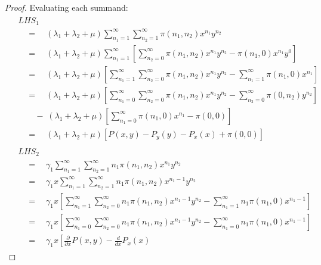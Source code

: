 \begin{proof}
    Evaluating each summand:
    \begin{align}
        \begin{split}
            & LHS_1 \\
            & \quad = \quad (\lambda_1 + \lambda_2 + \mu) \sum_{n_1=1}^{\infty} \sum_{n_2=1}^{\infty} \pi(n_1,n_2)x^{n_1}y^{n_2} \\
            & \quad = \quad (\lambda_1 + \lambda_2 + \mu) \sum_{n_1=1}^{\infty} \left[ \sum_{n_2=0}^{\infty} \pi(n_1,n_2) x^{n_1}y^{n_2} - \pi(n_1,0) x^{n_1} y^0 \right] \\
            & \quad = \quad (\lambda_1 + \lambda_2 + \mu) \left[
                \sum_{n_1=1}^{\infty} \sum_{n_2=0}^{\infty} \pi(n_1,n_2) x^{n_1}y^{n_2}
                - \sum_{n_1=1}^{\infty} \pi(n_1,0) x^{n_1}
            \right] \\
            & \quad = \quad (\lambda_1 + \lambda_2 + \mu) \left[
                \sum_{n_1=0}^{\infty} \sum_{n_2=0}^{\infty} \pi(n_1,n_2) x^{n_1}y^{n_2}
                - \sum_{n_2=0}^{\infty} \pi(0,n_2) y^{n_2}
            \right] \\
            & \quad \quad - \; (\lambda_1 + \lambda_2 + \mu) \left[
                \sum_{n_1=0}^{\infty} \pi(n_1,0) x^{n_1} - \pi(0,0)
            \right] \\
            & \quad = \quad (\lambda_1 + \lambda_2 + \mu) \left[ P(x,y) - P_y(y) - P_x(x) + \pi(0,0) \right]
        \end{split} \\
        \begin{split}
            & LHS_2 \\
            & \quad = \quad \gamma_1 \sum_{n_1=1}^{\infty} \sum_{n_2=1}^{\infty} n_1 \pi(n_1,n_2) x^{n_1} y^{n_2} \\
            & \quad = \quad \gamma_1 x \sum_{n_1=1}^{\infty} \sum_{n_2=1}^{\infty} n_1 \pi(n_1,n_2) x^{n_1-1} y^{n_2} \\
            & \quad = \quad \gamma_1 x \left[
                \sum_{n_1=1}^{\infty} \sum_{n_2=0}^{\infty} n_1 \pi(n_1,n_2) x^{n_1-1} y^{n_2}
                - \sum_{n_1=1}^{\infty} n_1 \pi(n_1,0) x^{n_1-1}
            \right] \\
            & \quad = \quad \gamma_1 x \left[
                \sum_{n_1=0}^{\infty} \sum_{n_2=0}^{\infty} n_1 \pi(n_1,n_2) x^{n_1-1} y^{n_2}
                - \sum_{n_1=0}^{\infty} n_1 \pi(n_1,0) x^{n_1-1}
            \right] \\
            & \quad = \quad \gamma_1 x \left[
                \frac{\partial}{\partial x} P(x,y) - \frac{d}{dx} P_x(x)

\end{split}
\end{align}
\end{proof}
